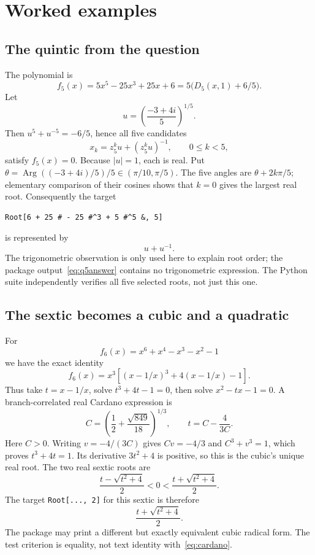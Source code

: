 \documentclass[11pt,a4paper]{article}
\newcommand{\code}[1]{\texttt{\small #1}}
\DeclareMathOperator{\Arg}{Arg}
\theoremstyle{definition}
\begin{document}
\section{Worked examples}
\subsection{The quintic from the question}
The polynomial is
\[
 f_5(x)=5x^5-25x^3+25x+6
       =5\bigl(D_5(x,1)+6/5\bigr).
\]
Let
\begin{equation}\label{eq:q5}
 u=\left(\frac{-3+4i}{5}\right)^{1/5}.
\end{equation}
Then $u^5+u^{-5}=-6/5$, hence all five candidates
\[
 x_k=z_5^k u+(z_5^k u)^{-1},\qquad 0\le k<5,
\]
satisfy $f_5(x)=0$. Because $|u|=1$, each is real. Put
$\theta=\Arg((-3+4i)/5)/5\in(\pi/10,\pi/5)$. The five angles are
$\theta+2k\pi/5$; elementary comparison of their cosines shows that $k=0$
gives the largest real root. Consequently the target
\begin{lstlisting}
Root[6 + 25 # - 25 #^3 + 5 #^5 &, 5]
\end{lstlisting}
is represented by
\begin{equation}\boxed{u+u^{-1}}.\label{eq:q5answer}\end{equation}
The trigonometric observation is only used here to explain root order; the
package output~\eqref{eq:q5answer} contains no trigonometric expression. The
Python suite independently verifies all five selected roots, not just this one.

\subsection{The sextic becomes a cubic and a quadratic}
For
\[
 f_6(x)=x^6+x^4-x^3-x^2-1
\]
we have the exact identity
\begin{equation}\label{eq:sextic}
 f_6(x)=x^3\left[(x-1/x)^3+4(x-1/x)-1\right].
\end{equation}
Thus take $t=x-1/x$, solve $t^3+4t-1=0$, then solve $x^2-tx-1=0$.
A branch-correlated real Cardano expression is
\begin{equation}\label{eq:cardano}
 C=\left(\frac12+\frac{\sqrt{849}}{18}\right)^{1/3},
 \qquad t=C-\frac{4}{3C}.
\end{equation}
Here $C>0$. Writing $v=-4/(3C)$ gives $Cv=-4/3$ and
$C^3+v^3=1$, which proves $t^3+4t=1$. Its derivative $3t^2+4$ is positive,
so this is the cubic's unique real root. The two real sextic roots are
\[
 \frac{t-\sqrt{t^2+4}}2<0<\frac{t+\sqrt{t^2+4}}2.
\]
The target \code{Root[..., 2]} for this sextic is therefore
\begin{equation}\boxed{\frac{t+\sqrt{t^2+4}}2}.\label{eq:sexticanswer}\end{equation}
The package may print a different but exactly equivalent cubic radical form.
The test criterion is equality, not text identity with~\eqref{eq:cardano}.
\end{document}
